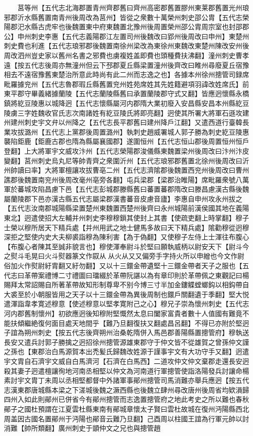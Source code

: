 　　莒等州【五代志北海郡置青州齊郡舊曰齊州高密郡舊置膠州東莱郡舊置光州琅邪郡沂水縣舊置南青州後周改為莒州】皆從之衆數十萬榮州刺史邵公胄【五代志榮陽郡汜水縣古虎牢也後魏置東中府東魏置北豫州後周置榮州邵公胄周宗室也封邵郡公】申州刺史李惠【五代志義陽郡江左置司州後魏改曰郢州後周改曰申州】東楚州刺史費也利進【五代志琅邪郡後魏置南徐州梁改為東徐州東魏改東楚州陳改安州後周改泗州豈史家以舊州名書之邪費也虜複姓盖即費也頭種費扶沸翻】潼州刺史曹孝遠【按五代志後周亦無潼州但云下邳郡夏丘縣梁置潼州後齊改曰睢州尋廢夏丘宿豫相去不遠宿豫舊東楚治所意此時尚有此二州而志逸之也】各據本州徐州摠管司録席毗羅據兖州【五代志魯郡瑕丘縣舊置兖州姓苑席姓其先姓籍避項羽諱改姓席氏】前東平郡守畢義緒據蘭陵【五代志蘭陵縣舊曰承置蘭陵郡守式又翻】皆應迥懷縣永橋鎮將紇豆陵惠以城降迥【五代志懷縣屬河内郡隋大業初廢入安昌縣安昌本州縣紇豆陵虜三字姓魏收官氏志次南諸姓有紇豆陵氏將即亮翻】迥使其所署大將軍石遜攻建州建州刺史宇文弁以州降之【五代志長平郡舊曰建州降戶江翻】又遣西道行臺韓長業攻拔潞州【五代志上黨郡後周置潞州】執刺史趙威署城人郭子勝為刺史紇豆陵惠襲陷鉅鹿【鉅鹿古郡也隋為縣屬襄國郡】遂圍恒州【五代志恒山郡後周置恒州恒戶登翻】上大將軍宇文威攻汴州【五代志榮陽郡浚儀縣東魏置梁州後周改曰汴州汴皮變翻】莒州刺史烏丸尼等帥青齊之衆圍沂州【五代志琅邪郡舊置北徐州後周改曰沂州帥讀曰率】大將軍檀讓攻拔曹亳二州【五代志濟隂郡後魏置西兖州後周改曰曹州譙郡後魏置南兖州後周改毫州亳旁各翻】屯兵梁郡【梁郡治睢陽】席毗羅衆號八萬軍於蕃城攻陷昌慮下邑【五代志彭城郡滕縣舊曰蕃置蕃郡隋改曰滕昌慮漢古縣後魏屬蘭陵郡下邑亦漢古縣五代志屬梁郡漢書蕃音皮慮音廬】李惠自申州攻永州拔之【五代志汝南郡城陽縣梁置楚州東魏置西楚州後齊曰永州城陽前漢侯國其地在義陽東北】迥遣使招大左輔并州刺史李穆穆鎻其使封上其書【使疏吏翻上時掌翻】穆子士榮以穆所居天下精兵處【并州用武之地士健馬多故曰天下精兵處】隂勸穆從迥穆深拒之堅使内史大夫柳裘詣穆為陳利害【為于偽翻】又使穆子左侍上士渾往布腹心【布腹心者陳其至誠非貌言也】穆使渾奉尉斗於堅曰願執威柄以尉安天下【尉斗今之熨斗毛晃曰火斗熨器篆文作叞从从火从又又偏旁手字持火所以申繒也今文作尉俗加火作熨尉紆胄翻又紆勿翻】又以十三鐶金帶遺堅十三鐶金帶者天子之服也【五代志曰革帶案禮博二寸禮圖曰璫綴於革帶阮諶以為有章印則於革帶佩之東觀記曰楊賜拜太常詔賜自所著革帶故知形制尊卑不别今博三寸半加金鏤䚢螳螂鈎以相鈎帶自大裘至於小朝服皆用之天子以十三鐶金帶為異後周制也鐶戶關翻遺于季翻】堅大悦遣渾詣韋孝寛述穆意【使述穆意以堅孝寛附己之心】穆兄子崇為懷州刺史【五代志河内郡舊制懷州】初欲應迥後知穆附堅慨然太息曰闔家富貴者數十人值國有難竟不能扶傾繼絶復何面目處天地間乎【難乃旦翻復扶又翻處昌呂翻】不得已亦附於堅迥子誼為朔州刺史【按五代志後齊朔州治桑乾隋併入馬邑郡善陽縣置摠管府】穆執送長安又遣兵討郭子勝擒之迥招徐州摠管源雄東郡守于仲文皆不從雄賀之曾孫仲文謹之孫也【東郡治白馬源賀本出禿髪氏歸魏改姓源于謹事宇文有大功守手又翻】迥遣宇文胄自石濟宇文威自白馬濟河【石濟在白馬西】二道攻仲文仲文棄郡走還長安迥殺其妻子迥遣檀讓徇地河南丞相堅以仲文為河南道行軍摠管使詣洛陽發兵討讓命楊素討宇文胄丁未周以丞相堅都督中外諸軍事鄖州摠管司馬消難亦舉兵應迥【按五代志漢東郡唐城縣本梁之下溠城後魏之㵐西縣也後魏立肆州尋改唐州後周省均欵溳歸四州入如此則鄖州已併省今有鄖州摠管而志逸置摠管府之地此考史之所以難也春秋鄖子之國杜預謂在江夏雲杜縣東南有鄖城章懷太子賢曰雲杜故城在復州沔陽縣西北周盖因古國名置鄖州于沔陽也鄖音云難乃旦翻】己酉周以柱國王誼為行軍元帥以討消難【帥所類翻】廣州刺史于顗仲文之兄也與摠管趙